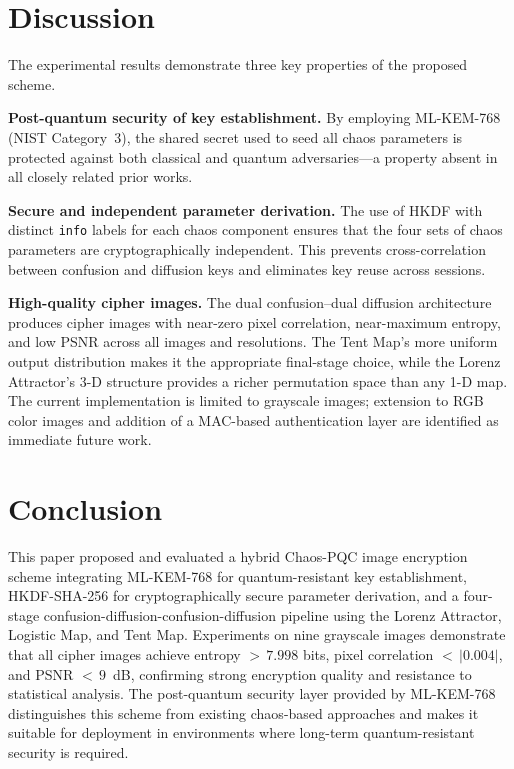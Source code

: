 \documentclass[conference]{IEEEtran}
\begin{document}
\section{Discussion}

The experimental results demonstrate three key properties of the proposed scheme.

\textbf{Post-quantum security of key establishment.} By employing ML-KEM-768 (NIST Category~3), the shared secret used to seed all chaos parameters is protected against both classical and quantum adversaries---a property absent in all closely related prior works.

\textbf{Secure and independent parameter derivation.} The use of HKDF with distinct \texttt{info} labels for each chaos component ensures that the four sets of chaos parameters are cryptographically independent. This prevents cross-correlation between confusion and diffusion keys and eliminates key reuse across sessions.

\textbf{High-quality cipher images.} The dual confusion--dual diffusion architecture produces cipher images with near-zero pixel correlation, near-maximum entropy, and low PSNR across all images and resolutions. The Tent Map's more uniform output distribution \cite{b25} makes it the appropriate final-stage choice, while the Lorenz Attractor's 3-D structure provides a richer permutation space than any 1-D map. The current implementation is limited to grayscale images; extension to RGB color images and addition of a MAC-based authentication layer are identified as immediate future work.

\section{Conclusion}

This paper proposed and evaluated a hybrid Chaos-PQC image encryption scheme integrating ML-KEM-768 for quantum-resistant key establishment, HKDF-SHA-256 for cryptographically secure parameter derivation, and a four-stage confusion-diffusion-confusion-diffusion pipeline using the Lorenz Attractor, Logistic Map, and Tent Map. Experiments on nine grayscale images demonstrate that all cipher images achieve entropy ${>}\,7.998$ bits, pixel correlation ${<}\,|0.004|$, and PSNR ${<}\,9$~dB, confirming strong encryption quality and resistance to statistical analysis. The post-quantum security layer provided by ML-KEM-768 distinguishes this scheme from existing chaos-based approaches and makes it suitable for deployment in environments where long-term quantum-resistant security is required.
\end{document}
